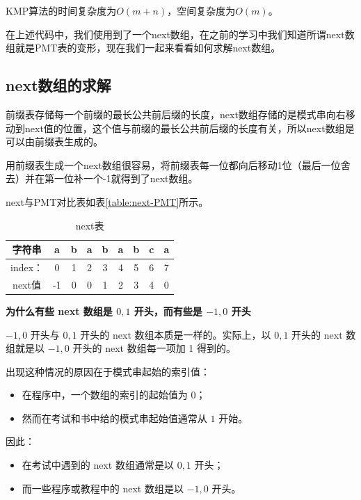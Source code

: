 \documentclass[lang=cn,newtx,10pt,scheme=chinese]{../elegantbook}
\begin{document}
KMP算法的时间复杂度为$O(m+n)$，空间复杂度为$O(m)$。


在上述代码中，我们使用到了一个next数组，在之前的学习中我们知道所谓next数组就是PMT表的变形，现在我们一起来看看如何求解next数组。

\subsection{next数组的求解}

前缀表存储每一个前缀的最长公共前后缀的长度，next数组存储的是模式串向右移动到next值的位置，这个值与前缀的最长公共前后缀的长度有关，所以next数组是可以由前缀表生成的。

用前缀表生成一个next数组很容易，将前缀表每一位都向后移动1位（最后一位舍去）并在第一位补一个-1就得到了next数组。

next与PMT对比表如表\ref{table:next-PMT}所示。

\begin{table}[htbp]
  \centering
  \caption{next表}
  \begin{tabular}{|c|c|c|c|c|c|c|c|c|}
    \hline
    字符串 & a & b & a & b & a & b & c & a \\
    \hline
    index： & 0 & 1 & 2 & 3 & 4 & 5 & 6 & 7 \\
    \hline
    next值 & -1 & 0 & 0 & 1 & 2 & 3 & 4 & 0 \\
    \hline
  \end{tabular}
  \label{table:next}
\end{table}

\textbf{为什么有些 next 数组是 $0, 1$ 开头，而有些是 $-1, 0$ 开头}

$-1, 0$ 开头与 $0, 1$ 开头的 next 数组本质是一样的。实际上，以 $0, 1$ 开头的 next 数组就是以 $-1, 0$ 开头的 next 数组每一项加 1 得到的。

出现这种情况的原因在于模式串起始的索引值：
\begin{itemize}
  \item 在程序中，一个数组的索引的起始值为 $0$；
  \item 然而在考试和书中给的模式串起始值通常从 $1$ 开始。
\end{itemize}

因此：
\begin{itemize}
  \item 在考试中遇到的 next 数组通常是以 $0, 1$ 开头；
  \item 而一些程序或教程中的 next 数组是以 $-1, 0$ 开头。
\end{itemize}
\end{document}
